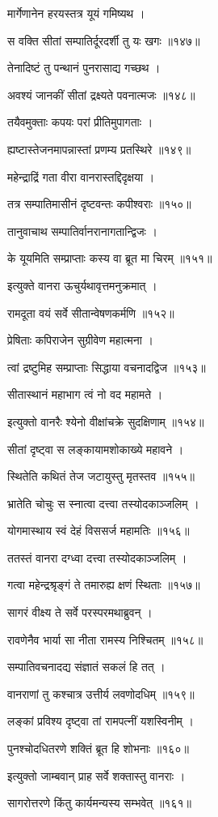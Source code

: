 मार्गेणानेन हरयस्तत्र यूयं गमिष्यथ ।

स वक्ति सीतां सम्पातिर्दूरदर्शी तु यः खगः ॥१४७॥

तेनादिष्टं तु पन्थानं पुनरासाद्य गच्छथ ।

अवश्यं जानकीं सीतां द्रक्ष्यते पवनात्मजः ॥१४८॥

तयैवमुक्ताः कपयः परां प्रीतिमुपागताः ।

ह्यष्टास्तेजनमापन्नास्तां प्रणम्य प्रतस्थिरे ॥१४९॥

महेन्द्राद्रिं गता वीरा वानरास्तद्दिदृक्षया ।

तत्र सम्पातिमासीनं दृष्टवन्तः कपीश्वराः ॥१५०॥

तानुवाचाथ सम्पातिर्वानरानागतान्द्विजः ।

के यूयमिति सम्प्राप्ताः कस्य वा ब्रूत मा चिरम् ॥१५१॥

इत्युक्ते वानरा ऊचुर्यथावृत्तमनुक्रमात् ।

रामदूता वयं सर्वे सीतान्वेषणकर्मणि ॥१५२॥

प्रेषिताः कपिराजेन सुग्रीवेण महात्मना ।

त्वां द्रष्टुमिह सम्प्राप्ताः सिद्धाया वचनादद्विज ॥१५३॥

सीतास्थानं महाभाग त्वं नो वद महामते ।

इत्युक्तो वानरैः श्येनो वीक्षांचक्रे सुदक्षिणाम् ॥१५४॥

सीतां दृष्ट्वा स लङ्कायामशोकाख्ये महावने ।

स्थितेति कथितं तेज जटायुस्तु मृतस्तव ॥१५५॥

भ्रातेति चोचुः स स्नात्वा दत्त्वा तस्योदकाञ्जलिम् ।

योगमास्थाय स्वं देहं विससर्ज महामतिः ॥१५६॥

ततस्तं वानरा दग्ध्वा दत्त्वा तस्योदकाञ्जलिम् ।

गत्वा महेन्द्रश्रृङ्गं ते तमारुह्य क्षणं स्थिताः ॥१५७॥

सागरं वीक्ष्य ते सर्वे परस्परमथाब्रुवन् ।

रावणेनैव भार्या सा नीता रामस्य निश्चितम् ॥१५८॥

सम्पातिवचनादद्य संज्ञातं सकलं हि तत् ।

वानराणां तु कश्चात्र उत्तीर्य लवणोदधिम् ॥१५९॥

लङ्कां प्रविश्य दृष्ट्वा तां रामपत्नीं यशस्विनीम् ।

पुनश्चोदधितरणे शक्तिं ब्रूत हि शोभनाः ॥१६०॥

इत्युक्तो जाम्बवान् प्राह सर्वे शक्तास्तु वानराः ।

सागरोत्तरणे किंतु कार्यमन्यस्य सम्भवेत् ॥१६१॥

